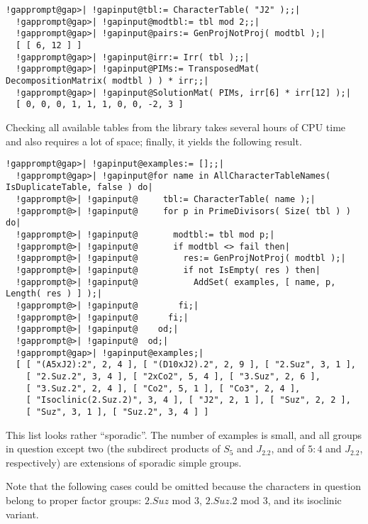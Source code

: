 \documentclass[a4paper,11pt]{report}
\begin{document}
{{{ 
\begin{Verbatim}[commandchars=!@|,fontsize=\small,frame=single,label=Example]
  !gapprompt@gap>| !gapinput@tbl:= CharacterTable( "J2" );;|
  !gapprompt@gap>| !gapinput@modtbl:= tbl mod 2;;|
  !gapprompt@gap>| !gapinput@pairs:= GenProjNotProj( modtbl );|
  [ [ 6, 12 ] ]
  !gapprompt@gap>| !gapinput@irr:= Irr( tbl );;|
  !gapprompt@gap>| !gapinput@PIMs:= TransposedMat( DecompositionMatrix( modtbl ) ) * irr;;|
  !gapprompt@gap>| !gapinput@SolutionMat( PIMs, irr[6] * irr[12] );|
  [ 0, 0, 0, 1, 1, 1, 0, 0, -2, 3 ]
\end{Verbatim}
 

 Checking all available tables from the library takes several hours of CPU time
and also requires a lot of space;  finally, it yields the following result. 

 
\begin{Verbatim}[commandchars=!@|,fontsize=\small,frame=single,label=Example]
  !gapprompt@gap>| !gapinput@examples:= [];;|
  !gapprompt@gap>| !gapinput@for name in AllCharacterTableNames( IsDuplicateTable, false ) do|
  !gapprompt@>| !gapinput@     tbl:= CharacterTable( name );|
  !gapprompt@>| !gapinput@     for p in PrimeDivisors( Size( tbl ) ) do|
  !gapprompt@>| !gapinput@       modtbl:= tbl mod p;|
  !gapprompt@>| !gapinput@       if modtbl <> fail then|
  !gapprompt@>| !gapinput@         res:= GenProjNotProj( modtbl );|
  !gapprompt@>| !gapinput@         if not IsEmpty( res ) then|
  !gapprompt@>| !gapinput@           AddSet( examples, [ name, p, Length( res ) ] );|
  !gapprompt@>| !gapinput@        fi;|
  !gapprompt@>| !gapinput@      fi;|
  !gapprompt@>| !gapinput@    od;|
  !gapprompt@>| !gapinput@  od;|
  !gapprompt@gap>| !gapinput@examples;|
  [ [ "(A5xJ2):2", 2, 4 ], [ "(D10xJ2).2", 2, 9 ], [ "2.Suz", 3, 1 ], 
    [ "2.Suz.2", 3, 4 ], [ "2xCo2", 5, 4 ], [ "3.Suz", 2, 6 ], 
    [ "3.Suz.2", 2, 4 ], [ "Co2", 5, 1 ], [ "Co3", 2, 4 ], 
    [ "Isoclinic(2.Suz.2)", 3, 4 ], [ "J2", 2, 1 ], [ "Suz", 2, 2 ], 
    [ "Suz", 3, 1 ], [ "Suz.2", 3, 4 ] ]
\end{Verbatim}
 This list looks rather ``sporadic''. The number of examples is small, and all groups in question except two (the
subdirect products of $S_5$ and $J_2.2$, and of $5:4$ and $J_2.2$, respectively) are extensions of sporadic simple groups. 

 Note that the following cases could be omitted because the characters in
question belong to proper factor groups: $2.Suz$ mod $3$, $2.Suz.2$ mod $3$, and its isoclinic variant. }

}}
\end{document}
